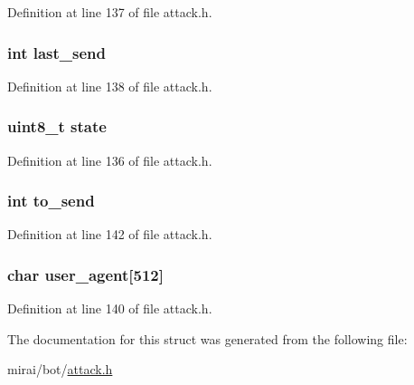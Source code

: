Definition at line 137 of file attack.\+h.

\subsubsection[{\texorpdfstring{last\+\_\+send}{last_send}}]{\setlength{\rightskip}{0pt plus 5cm}int last\+\_\+send}\hypertarget{structattack__cfnull__state_a04740a05fb3dde2a4f4fc74ebd900715}{}\label{structattack__cfnull__state_a04740a05fb3dde2a4f4fc74ebd900715}


Definition at line 138 of file attack.\+h.

\subsubsection[{\texorpdfstring{state}{state}}]{\setlength{\rightskip}{0pt plus 5cm}uint8\+\_\+t state}\hypertarget{structattack__cfnull__state_a0b57aa10271a66f3dc936bba1d2f3830}{}\label{structattack__cfnull__state_a0b57aa10271a66f3dc936bba1d2f3830}


Definition at line 136 of file attack.\+h.

\subsubsection[{\texorpdfstring{to\+\_\+send}{to_send}}]{\setlength{\rightskip}{0pt plus 5cm}int to\+\_\+send}\hypertarget{structattack__cfnull__state_a17ed86462464729ba8f66f8488aaf329}{}\label{structattack__cfnull__state_a17ed86462464729ba8f66f8488aaf329}


Definition at line 142 of file attack.\+h.

\subsubsection[{\texorpdfstring{user\+\_\+agent}{user_agent}}]{\setlength{\rightskip}{0pt plus 5cm}char user\+\_\+agent\mbox{[}512\mbox{]}}\hypertarget{structattack__cfnull__state_ad822f3afc6ca96d5e6968831ba0c9d25}{}\label{structattack__cfnull__state_ad822f3afc6ca96d5e6968831ba0c9d25}


Definition at line 140 of file attack.\+h.



The documentation for this struct was generated from the following file\+:\begin{DoxyCompactItemize}
\item 
mirai/bot/\hyperlink{attack_8h}{attack.\+h}\end{DoxyCompactItemize}
